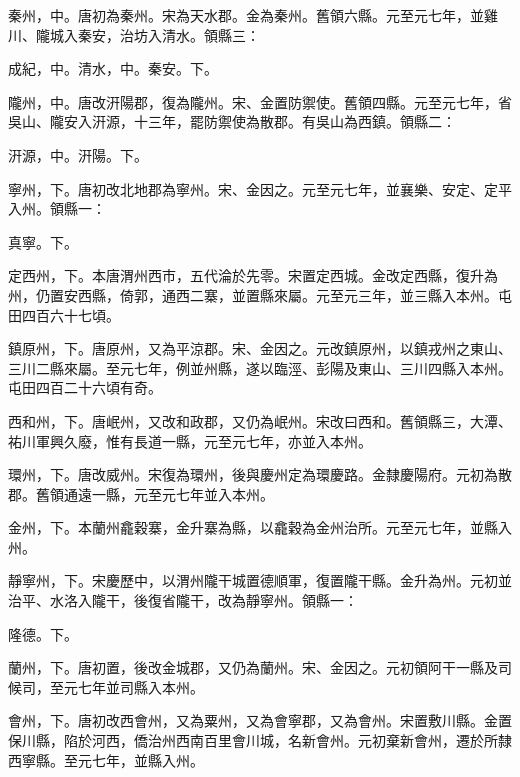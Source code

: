 \begin{pinyinscope}
 秦州，中。唐初為秦州。宋為天水郡。金為秦州。舊領六縣。元至元七年，並雞川、隴城入秦安，治坊入清水。領縣三：



 成紀，中。清水，中。秦安。下。



 隴州，中。唐改汧陽郡，復為隴州。宋、金置防禦使。舊領四縣。元至元七年，省吳山、隴安入汧源，十三年，罷防禦使為散郡。有吳山為西鎮。領縣二：



 汧源，中。汧陽。下。



 寧州，下。唐初改北地郡為寧州。宋、金因之。元至元七年，並襄樂、安定、定平入州。領縣一：



 真寧。下。



 定西州，下。本唐渭州西市，五代淪於先零。宋置定西城。金改定西縣，復升為州，仍置安西縣，倚郭，通西二寨，並置縣來屬。元至元三年，並三縣入本州。屯田四百六十七頃。



 鎮原州，下。唐原州，又為平涼郡。宋、金因之。元改鎮原州，以鎮戎州之東山、三川二縣來屬。至元七年，例並州縣，遂以臨涇、彭陽及東山、三川四縣入本州。屯田四百二十六頃有奇。



 西和州，下。唐岷州，又改和政郡，又仍為岷州。宋改曰西和。舊領縣三，大潭、祐川軍興久廢，惟有長道一縣，元至元七年，亦並入本州。



 環州，下。唐改威州。宋復為環州，後與慶州定為環慶路。金隸慶陽府。元初為散郡。舊領通遠一縣，元至元七年並入本州。



 金州，下。本蘭州龕穀寨，金升寨為縣，以龕穀為金州治所。元至元七年，並縣入州。



 靜寧州，下。宋慶歷中，以渭州隴干城置德順軍，復置隴干縣。金升為州。元初並治平、水洛入隴干，後復省隴干，改為靜寧州。領縣一：



 隆德。下。



 蘭州，下。唐初置，後改金城郡，又仍為蘭州。宋、金因之。元初領阿干一縣及司候司，至元七年並司縣入本州。



 會州，下。唐初改西會州，又為粟州，又為會寧郡，又為會州。宋置敷川縣。金置保川縣，陷於河西，僑治州西南百里會川城，名新會州。元初棄新會州，遷於所隸西寧縣。至元七年，並縣入州。




\end{pinyinscope}
